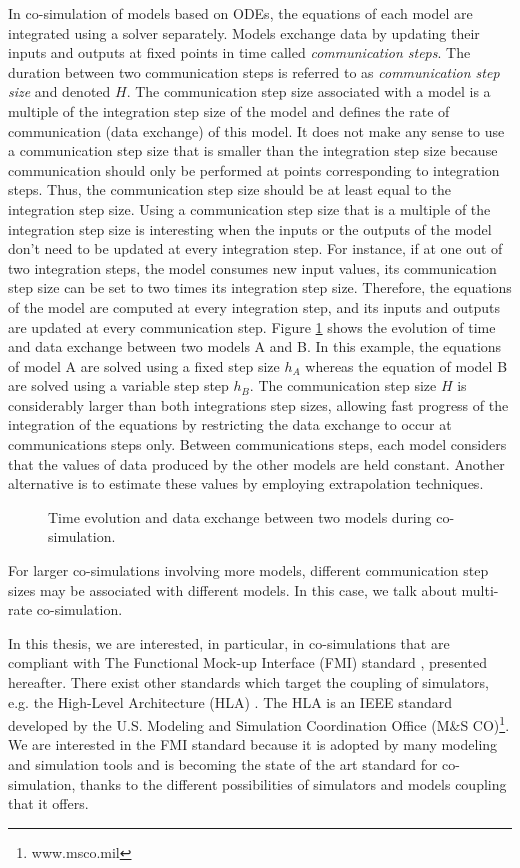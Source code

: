 In co-simulation of models based on ODEs, the equations of each model are integrated using a solver separately. 
Models exchange data by updating their inputs and outputs at fixed points in time called \textit{communication steps}. The duration between two communication steps is referred to as \textit{communication step size} and denoted $H$. The communication step size associated with a model is a multiple of the integration step size of the model and defines the rate of communication (data exchange) of this model. It does not make any sense to use a communication step size that is smaller than the integration step size because communication should only be performed at points corresponding to integration steps. Thus, the communication step size should be at least equal to the integration step size. Using a communication step size that is a multiple of the integration step size is interesting when the inputs or the outputs of the model don't need to be updated at every integration step. For instance, if at one out of two integration steps, the model consumes new input values, its communication step size can be set to two times its integration step size. Therefore, the equations of the model are computed at every integration step, and its inputs and outputs are updated at every communication step. 
Figure \ref{fig:cosim} shows the evolution of time and data exchange between two models A and B. In this example, the equations of model A are solved using a fixed step size $h_A$ whereas the equation of model B are solved using a variable step step $h_B$. The communication step size $H $ is considerably larger than both integrations step sizes, allowing fast progress of the integration of the equations by restricting the data exchange to occur at communications steps only. Between communications steps, each model considers that the values of data produced by the other models are held constant. Another alternative is to estimate these values by employing extrapolation techniques.

\begin{figure}[phbt]
\centering

\caption{Time evolution and data exchange between two models during co-simulation.}
\label{fig:cosim}
\end{figure}

For larger co-simulations involving more models, different communication step sizes may be associated with different models. In this case, we talk about multi-rate co-simulation.

In this thesis, we are interested, in particular, in co-simulations that are compliant with The Functional Mock-up Interface (FMI) standard \cite{fmi:2014}, presented hereafter. There exist other standards which target the coupling of simulators, e.g. the High-Level Architecture (HLA) \cite{ieee1516:2012}. The HLA is an IEEE standard developed by the U.S. Modeling and Simulation Coordination Office (M\&S CO)\footnote{www.msco.mil}. We are interested in the FMI standard because it is adopted by many modeling and simulation tools and is becoming the state of the art standard for co-simulation, thanks to the different possibilities of simulators and models coupling that it offers.

